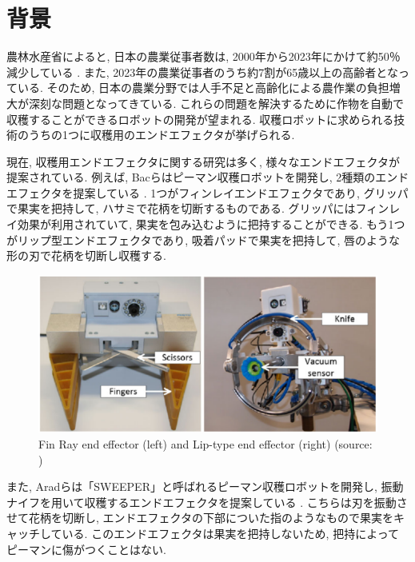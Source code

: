 
\section{背景}
農林水産省によると, 日本の農業従事者数は, 2000年から2023年にかけて約50％減少している \cite{farmer} .
また, 2023年の農業従事者のうち約7割が65歳以上の高齢者となっている.
そのため, 日本の農業分野では人手不足と高齢化による農作業の負担増大が深刻な問題となってきている.
これらの問題を解決するために作物を自動で収穫することができるロボットの開発が望まれる.
収穫ロボットに求められる技術のうちの1つに収穫用のエンドエフェクタが挙げられる.

\vspace{5mm}

現在, 収穫用エンドエフェクタに関する研究は多く, 様々なエンドエフェクタが提案されている.
例えば, Bacらはピーマン収穫ロボットを開発し, 2種類のエンドエフェクタを提案している \cite{finray}.
1つがフィンレイエンドエフェクタであり, グリッパで果実を把持して, ハサミで花柄を切断するものである.
グリッパにはフィンレイ効果が利用されていて, 果実を包み込むように把持することができる.
もう1つがリップ型エンドエフェクタであり, 吸着パッドで果実を把持して, 唇のような形の刃で花柄を切断し収穫する.

\begin{figure}[H]
     \centering
     \includegraphics[width=130mm]{images/png/finray.png}
     \caption[Fin Ray end effector (left) and Lip-type end effector (right)]{Fin Ray end effector (left) and Lip-type end effector (right) (source: \cite{finray})}
     \label{Fig:finray}
\end{figure}

また, Aradらは「SWEEPER」と呼ばれるピーマン収穫ロボットを開発し, 振動ナイフを用いて収穫するエンドエフェクタを提案している \cite{sweeper}.
こちらは刃を振動させて花柄を切断し, エンドエフェクタの下部についた指のようなもので果実をキャッチしている.
このエンドエフェクタは果実を把持しないため, 把持によってピーマンに傷がつくことはない.

